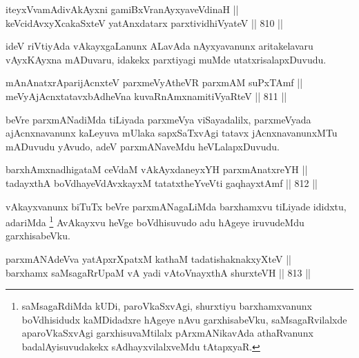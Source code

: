 \begin{shl}
iteyxVvamAdivAkAyxni gamiBxVranAyxyaveVdinaH || \\
keVcidAvxyXcakaSxteV yatAnxdatarx parxtividhiVyateV \hfill || 810 ||  
\end{shl}

\begin{artha}
ideV riVtiyAda vAkayxgaLanunx ALavAda nAyxyavanunx aritakelavaru vAyxKAyxna mADuvaru, idakekx parxtiyagi muMde utatxrisalapxDuvudu.
\end{artha}


\begin{shl}
mAnAnatxrAparijAcnxteV parxmeVyAtheVR parxmAM suPxTAmf || \\
meVyAjAcnxtatavxbAdheVna kuvaRnAmxnamitiVyaRteV \hfill || 811 ||  
\end{shl}

\begin{artha}
beVre parxmANadiMda tiLiyada parxmeVya viSayadalilx, parxmeVyada ajAcnxnavanunx kaLeyuva mUlaka sapxSaTxvAgi tatavx jAcnxnavanunxMTu mADuvudu yAvudo, adeV parxmANaveMdu heVLalapxDuvudu.
\end{artha}


\begin{shl}
barxhAmxnadhigataM ceVdaM vAkAyxdaneyxYH parxmAnatxreYH || \\
tadayxthA boVdhayeVdAvxkayxM tatatxtheYveVti gaqhayxtAmf \hfill || 812 ||  
\end{shl}

\begin{artha}
vAkayxvanunx biTuTx beVre parxmANagaLiMda barxhamxvu tiLiyade ididxtu, adariMda \footnote{saMsagaRdiMda kUDi, paroVkaSxvAgi, shurxtiyu barxhamxvanunx boVdhisidudx kaMDidadxre hAgeye nAvu garxhisabeVku, saMsagaRvilalxde aparoVkaSxvAgi garxhisuvaMtilalx pArxmANikavAda athaRvanunx badalAyisuvudakekx sAdhayxvilalxveMdu tAtapxyaR.} AvAkayxvu heVge boVdhisuvudo adu hAgeye iruvudeMdu garxhisabeVku.
\end{artha}


\begin{shl}
parxmANAdeVva yatApxrXpatxM kathaM tadatishaknakxyXteV || \\
barxhamx saMsagaRrUpaM vA yadi vA\s toV\s nayxthA shurxteVH \hfill || 813 ||  
\end{shl}

